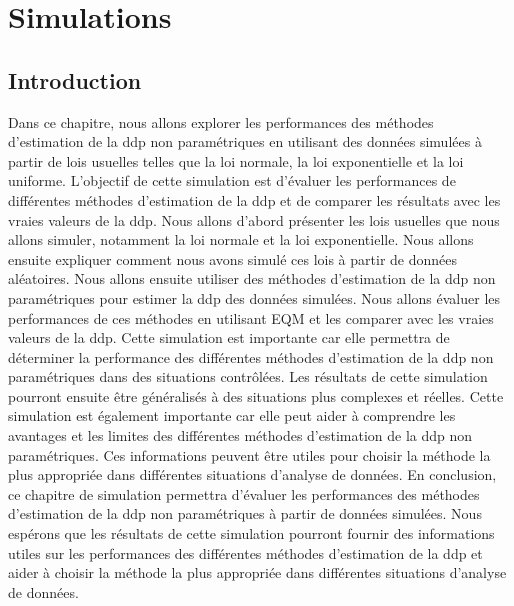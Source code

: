 \chapter{Simulations}
\section{Introduction}
Dans ce chapitre, nous allons explorer les performances des méthodes d'estimation de la ddp non paramétriques en utilisant des données simulées à partir de lois usuelles telles que la loi normale, la loi exponentielle et la loi uniforme. L'objectif de cette simulation est d'évaluer les performances de différentes méthodes d'estimation de la ddp et de comparer les résultats avec les vraies valeurs de la ddp.
Nous allons d'abord présenter les lois usuelles que nous allons simuler, notamment la loi normale et la loi exponentielle. Nous allons ensuite expliquer comment nous avons simulé ces lois à partir de données aléatoires. Nous allons ensuite utiliser des méthodes d'estimation de la ddp non paramétriques pour estimer la ddp des données simulées. Nous allons évaluer les performances de ces méthodes en utilisant EQM et les comparer avec les vraies valeurs de la ddp.
Cette simulation est importante car elle permettra de déterminer la performance des différentes méthodes d'estimation de la ddp non paramétriques dans des situations contrôlées. Les résultats de cette simulation pourront ensuite être généralisés à des situations plus complexes et réelles. Cette simulation est également importante car elle peut aider à comprendre les avantages et les limites des différentes méthodes d'estimation de la ddp non paramétriques. Ces informations peuvent être utiles pour choisir la méthode la plus appropriée dans différentes situations d'analyse de données.
En conclusion, ce chapitre de simulation permettra d'évaluer les performances des méthodes d'estimation de la ddp non paramétriques à partir de données simulées. Nous espérons que les résultats de cette simulation pourront fournir des informations utiles sur les performances des différentes méthodes d'estimation de la ddp et aider à choisir la méthode la plus appropriée dans différentes situations d'analyse de données.
\newpage

